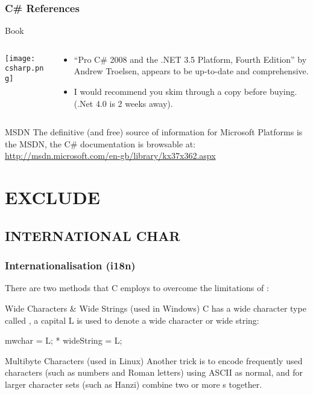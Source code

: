 \documentclass[smaller,table]{beamer} %
\begin{document}
\begin{frame}
\frametitle{C\# References}
\begin{block}{Book}
\begin{columns}
\begin{column}{1.7cm}
\texttt{[image: csharp.png]}
\end{column}
\begin{column}{0.8\textwidth}
\begin{itemize}
\item ``Pro C\# 2008 and the .NET 3.5 Platform, Fourth Edition'' by Andrew Troelsen,
appears to be up-to-date and comprehensive.
\item I would recommend you skim through a copy before buying. (.Net 4.0 is 2 weeks away).
\end{itemize}
\end{column}
\end{columns}
\end{block}
\begin{exampleblock}{MSDN}
The definitive (and free) source of information for Microsoft Platforms is the MSDN, the C\# documentation is browsable at:\\
{\small\url{http://msdn.microsoft.com/en-gb/library/kx37x362.aspx}}
\end{exampleblock}
\end{frame}


\section{EXCLUDE}
\subsection{INTERNATIONAL CHAR}
\begin{frame}[fragile]
\frametitle{Internationalisation (i18n)}
There are two methods that C employs to overcome the limitations of {\tt {}}:
\begin{block}{Wide Characters \& Wide Strings (used in Windows)}
C has a wide character type called {\tt {}}, a capital L is used to denote a wide character or wide string:
\vspace{-0.1in}
\begin{semiverbatim}
 mwchar = L;
 * wideString = L;
\end{semiverbatim}
\end{block}

\begin{block}{Multibyte Characters (used in Linux)}
Another trick is to encode frequently used characters (such as numbers and Roman letters) using ASCII as normal, and for larger character sets (such as Hanzi) combine two or more {\tt {}}s together.
\end{block}
\end{frame}
\end{document}

